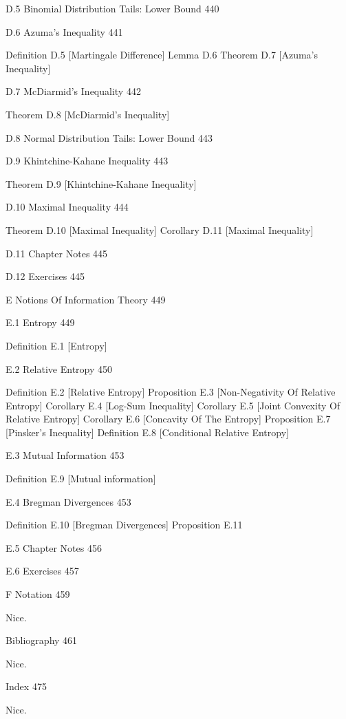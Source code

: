 D.5 Binomial Distribution Tails: Lower Bound 440



D.6 Azuma's Inequality 441

Definition D.5 [Martingale Difference]
Lemma D.6
Theorem D.7 [Azuma's Inequality]

D.7 McDiarmid's Inequality 442

Theorem D.8 [McDiarmid's Inequality]

D.8 Normal Distribution Tails: Lower Bound 443



D.9 Khintchine-Kahane Inequality 443

Theorem D.9 [Khintchine-Kahane Inequality]

D.10 Maximal Inequality 444

Theorem D.10 [Maximal Inequality]
Corollary D.11 [Maximal Inequality]

D.11 Chapter Notes 445



D.12 Exercises 445



E Notions Of Information Theory 449



E.1 Entropy 449

Definition E.1 [Entropy]

E.2 Relative Entropy 450

Definition E.2 [Relative Entropy]
Proposition E.3 [Non-Negativity Of Relative Entropy]
Corollary E.4 [Log-Sum Inequality]
Corollary E.5 [Joint Convexity Of Relative Entropy]
Corollary E.6 [Concavity Of The Entropy]
Proposition E.7 [Pinsker's Inequality]
Definition E.8 [Conditional Relative Entropy]

E.3 Mutual Information 453

Definition E.9 [Mutual information]

E.4 Bregman Divergences 453

Definition E.10 [Bregman Divergences]
Proposition E.11

E.5 Chapter Notes 456



E.6 Exercises 457



F Notation 459

Nice.

Bibliography 461

Nice.

Index 475

Nice.